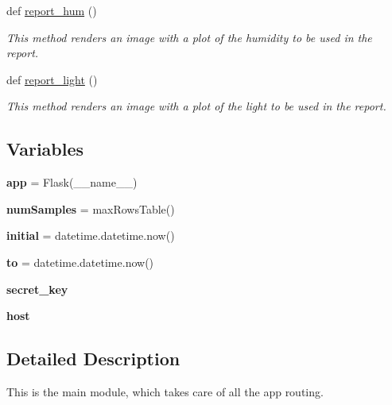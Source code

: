 \begin{DoxyCompactItemize}
def \hyperlink{namespacesleep__app_a18ff8b53c78d6e72682a2b1c19e73aa2}{report\+\_\+hum} ()
\begin{DoxyCompactList}\small\item\em This method renders an image with a plot of the humidity to be used in the report. \end{DoxyCompactList}\item 
def \hyperlink{namespacesleep__app_a723dcf6e683d8f98fa39a98758284dd0}{report\+\_\+light} ()
\begin{DoxyCompactList}\small\item\em This method renders an image with a plot of the light to be used in the report. \end{DoxyCompactList}\end{DoxyCompactItemize}
\subsection*{Variables}
\begin{DoxyCompactItemize}
\item 
\mbox{\label{namespacesleep__app_ae2a85cfeecdae009dfd704f154c94147}} 
{\bfseries app} = Flask(\+\_\+\+\_\+name\+\_\+\+\_\+)
\item 
\mbox{\label{namespacesleep__app_a6dac67f22016c3d4c999ad70c487e760}} 
{\bfseries num\+Samples} = max\+Rows\+Table()
\item 
\mbox{\label{namespacesleep__app_aa67c1e9c8904afb26c8ef03b1b88aeb4}} 
{\bfseries initial} = datetime.\+datetime.\+now()
\item 
\mbox{\label{namespacesleep__app_a30eb0070453ccf6faab79fd68f0789bd}} 
{\bfseries to} = datetime.\+datetime.\+now()
\item 
\mbox{\label{namespacesleep__app_aaa9b3757253ba1384305a31766fc7673}} 
{\bfseries secret\+\_\+key}
\item 
\mbox{\label{namespacesleep__app_a10f9fd0591e1d99cf1f0b453708b314e}} 
{\bfseries host}
\end{DoxyCompactItemize}


\subsection{Detailed Description}
This is the main module, which takes care of all the app routing. 

